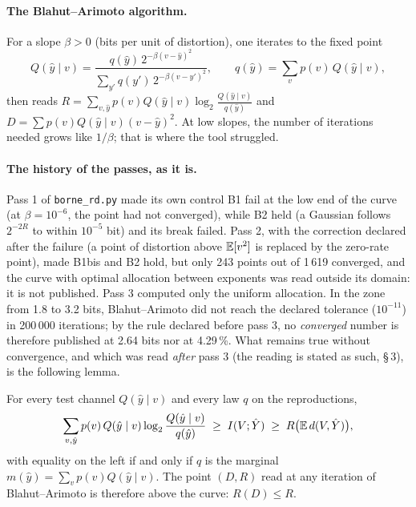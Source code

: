 \paragraph{The Blahut--Arimoto algorithm.} For a slope $\beta > 0$ (bits per unit of distortion), one iterates to the fixed point~\cite{blahut1972}
\begin{equation}\label{t3que:eq:ba}
Q(\hat y \mid v) = \frac{q(\hat y)\, 2^{-\beta (v - \hat y)^2}}{\sum_{y'} q(y')\, 2^{-\beta (v - y')^2}}, \qquad q(\hat y) = \sum_v p(v)\, Q(\hat y \mid v),
\end{equation}
then reads $R = \sum_{v, \hat y} p(v) Q(\hat y\mid v) \log_2 \frac{Q(\hat y\mid v)}{q(\hat y)}$ and $D = \sum p(v) Q(\hat y\mid v)(v - \hat y)^2$. At low slopes, the number of iterations needed grows like $1/\beta$; that is where the tool struggled.

\paragraph{The history of the passes, as it is.} Pass 1 of \texttt{borne\_rd.py} made its own control B1 fail at the low end of the curve (at $\beta = 10^{-6}$, the point had not converged), while B2 held (a Gaussian follows $2^{-2R}$ to within $10^{-5}$ bit) and its break failed. Pass 2, with the correction declared after the failure (a point of distortion above $\mathbb{E}[v^2]$ is replaced by the zero-rate point), made B1bis and B2 hold, but only 243 points out of 1\,619 converged, and the curve with optimal allocation between exponents was read outside its domain: it is not published. Pass 3 computed only the uniform allocation. In the zone from 1.8 to 3.2 bits, Blahut--Arimoto did not reach the declared tolerance ($10^{-11}$) in 200\,000 iterations; by the rule declared before pass 3, no \emph{converged} number is therefore published at 2.64 bits nor at 4.29\,\%. What remains true without convergence, and which was read \emph{after} pass 3 (the reading is stated as such,  §\,3), is the following lemma.

\begin{lemme}\label{t3que:lem:ba}
For every test channel $Q(\hat y \mid v)$ and every law $q$ on the reproductions,
\begin{equation}\label{t3que:eq:ba-borne}
\sum_{v, \hat y} p(v)\, Q(\hat y\mid v) \log_2 \frac{Q(\hat y\mid v)}{q(\hat y)} \;\ge\; I(V ; \hat Y) \;\ge\; R\bigl(\mathbb{E}\, d(V, \hat Y)\bigr),
\end{equation}
with equality on the left if and only if $q$ is the marginal $m(\hat y) = \sum_v p(v) Q(\hat y \mid v)$. The point $(D, R)$ read at any iteration of Blahut--Arimoto is therefore above the curve: $R(D) \le R$.
\end{lemme}

